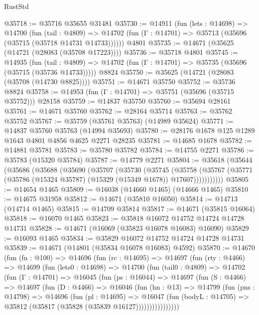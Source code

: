 \begin{lexlean}{RustStd}
\begin{coremodule}
@35718 := @35716 @35655 @31481
@35730 := @14911
    (fun (lets : @14698) =>
    @14700
      (fun (tail : @4809) =>
      @14702 (fun (Γ : @14701) => @35713 (@35696 (@35715 (@35718 @14731 @14733))))))
    @4801
@35735 := @14671 (@35625 (@14721 (@28083 (@35708 @17223))))
@35736 := @35718 @4801
@35745 := @14935
    (fun (tail : @4809) => @14702 (fun (Γ : @14701) => @35735 (@35696 (@35715 (@35736 @14733)))))
    @8824
@35750 := @35625 (@14721 (@28083 (@35708 (@14730 @8825))))
@35751 := @14671 @35750
@35752 := @35736 @8824
@35758 := @14953 (fun (Γ : @14701) => @35751 (@35696 (@35715 @35752))) @28158
@35759 := @14837 @35750
@35760 := @35694 @28161
@35761 := @14671 @35760
@35762 := @28164 @35714
@35763 := @35762 @35752
@35767 := @35759 (@35761 @35763) (@14989 @35624)
@35771 := @14837 @35760 @35763 (@14994 @35693)
@35780 := @28176 @1678 @125 @1289 @1643 @4801 @4856 @4625 @2271 @28235
@35781 := @14685 @1678
@35782 := @14881 @35781
@35783 := @35780 @35782
@35784 := @14755 @2271
@35786 := @35783 (@15320 @35784)
@35787 := @14779 @2271
@35804 := @35618
    (@35644
      (@35686
        (@35688
          (@35690
            (@35707
              (@35730
                (@35745
                  (@35758
                    (@35767
                      (@35771 (@35786 (@15324 @35787) (@15329 (@15349 @1678)) @17607)))))))))))
@35805 := @14654 @1465
@35809 := @16038 (@14660 @1465) (@14666 @1465)
@35810 := @14675 @31958
@35812 := @14671 (@35810 @16050)
@35814 := @14713 (@14714 @1465)
@35815 := @14709 @35814
@35817 := @14671 (@35815 @16064)
@35818 := @16070 @1465
@35823 := @35818 @16072 @14752 @14724 @14728 @14731
@35828 := @14671 (@16069 (@35823 @16078 @16083) @16090)
@35829 := @16093 @1465
@35834 := @35829 @16072 @14752 @14724 @14728 @14731
@35839 := @14671 (@14801 (@35834 @16078 @16083) @4592)
@35870 := @14670
    (fun (fn : @100) =>
    @14696
      (fun (rc : @14695) =>
      @14697
        (fun (rty : @4466) =>
        @14699
          (fun (lets0 : @14698) =>
          @14700
            (fun (tail0 : @4809) =>
            @14702
              (fun (Γ : @14701) =>
              @16045
                (fun (ps : @16044) =>
                @14697
                  (fun (S : @4466) =>
                  @14697
                    (fun (D : @4466) =>
                    @16046
                      (fun (hn : @13) =>
                      @14799
                        (fun (pns : @14798) =>
                        @14696
                          (fun (pl : @14695) =>
                          @16047
                            (fun (bodyL : @14705) =>
                            @35812 (@35817 (@35828 (@35839 @16127))))))))))))))))

\end{coremodule}
\end{lexlean}
